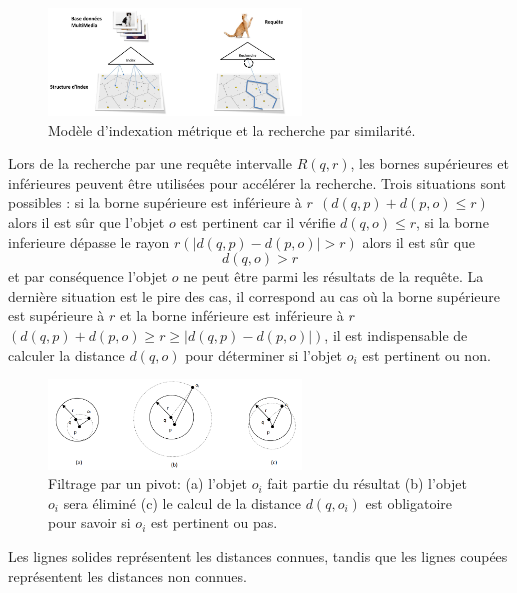 \begin{figure}[H]
	\centering
	\includegraphics[width=0.6\textwidth]{Figures/similarity.png} %
	\caption{Modèle d'indexation métrique et la recherche par similarité.}
\end{figure}

Lors de la recherche par une requête intervalle $ R(q,r) $, les bornes supérieures et inférieures peuvent être utilisées pour accélérer la recherche. Trois situations sont possibles : si la borne supérieure est inférieure à $  r ~~ (d(q,p)+d(p,o) \leq r ) $ alors il est sûr que l’objet $ o $ est pertinent car il vérifie $ d(q,o) \leq r $, si la borne inferieure dépasse le rayon $ r ( |d(q,p)-d(p,o)| > r )  $ alors il est sûr que \begin{displaymath}
	d(q,o) > r
\end{displaymath} et par conséquence l’objet $ o $ ne peut être parmi les résultats de la requête. La dernière situation est le pire des cas, il correspond au cas où la borne supérieure est supérieure à $ r $ et la borne inférieure est inférieure à  $ r $  $  (d(q,p)+d(p,o) \geq r\geq |d(q,p)-d(p,o)|) $, il est indispensable de calculer la distance $ d(q,o) $ pour déterminer si l’objet $ o_i $ est pertinent ou non.

\begin{figure}[H]
	\centering
	\includegraphics[width=0.6\textwidth]{Figures/pivot.png} %
	\caption{Filtrage par un pivot: (a) l'objet $  o_i $ fait partie du résultat (b) l'objet $ o_i $ sera éliminé (c) le calcul de la
		distance $ d(q,o_i) $ est obligatoire pour savoir si $ o_i $ est pertinent ou pas.}
\end{figure}

Les lignes solides représentent les distances connues, tandis que les lignes coupées représentent les distances non connues.\\

